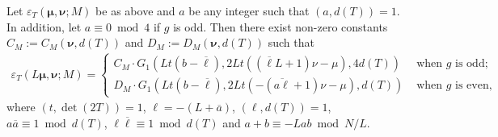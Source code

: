 \documentclass[11pt]{amsart}
\numberwithin{equation}{section}
\begin{document}
\begin{lemma}\label{lem:epsT}
    Let $\varepsilon_{T}(\bm\mu, \bm\nu;M)$ be as above and $a$ be any integer such that $(a, d(T))=1$. In addition, let $a\equiv 0\bmod 4$ if $g$ is odd. Then there exist non-zero constants $C_M:=C_M(\bm\nu, d(T))$ and $D_M:=D_M(\bm\nu, d(T))$ such that
    \begin{align}
     \varepsilon_{T}(L\bm\mu, \bm\nu;M)=\begin{cases}
       C_M \cdot G_1(Lt(b-\overline{\ell}),2Lt ((\overline{\ell}L+1)\nu-\mu), 4d(T)) &\text{ when } g \text{ is odd;}\\
        D_M \cdot G_1(Lt(b-\overline{\ell}),2Lt (-(\overline{a\ell}+1)\nu-\mu), d(T))&\text{ when } g \text{ is even,}
     \end{cases}   
    \end{align}
where $(t, \det(2T))=1$, $\ell=-( L+\overline{a})$, $(\ell, d(T))=1$, $a\overline{a}\equiv 1\bmod d(T)$, $\ell\overline{\ell}\equiv 1\bmod d(T)$  and $a+b\equiv -Lab \bmod N/L$.
\end{lemma}
\end{document}
